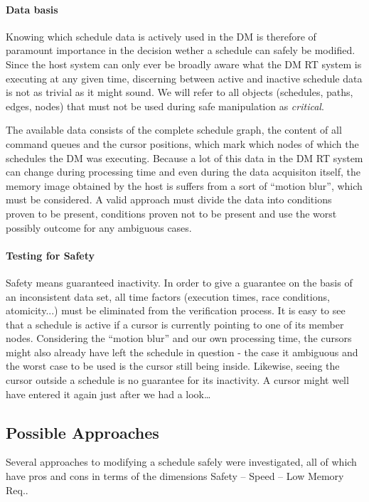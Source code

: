 \paragraph{Data basis}
Knowing which schedule data is actively used in the DM is therefore of paramount importance in the decision wether a schedule can safely be modified.
Since the host system can only ever be broadly aware what the DM RT system is executing at any given time, discerning between active and inactive schedule data is not as trivial as it might sound.
We will refer to all objects (schedules, paths, edges, nodes) that must not be used during safe manipulation as \emph{critical}.
\par
The available data consists of the complete schedule graph, the content of all command queues and the cursor positions, which mark which nodes of which the schedules the DM was executing.
Because a lot of this data in the DM RT system can change during processing time and even during the data acquisiton itself, the memory image obtained by the host is suffers from a sort of \enquote{motion blur}, which must be considered. A valid approach must divide the data into conditions proven to be present, conditions proven not to be present and use the worst possibly outcome for any ambiguous cases.
\paragraph{Testing for Safety}
Safety means guaranteed inactivity. In order to give a guarantee on the basis of an inconsistent data set, all time factors (execution times, race conditions, atomicity...) must be eliminated from the verification process.
It is easy to see that a schedule is active if a cursor is currently pointing to one of its member nodes.
Considering the \enquote{motion blur} and our own processing time, the cursors might also already have left the schedule in question - the case it ambiguous and the worst case to be used is the cursor still being inside.
Likewise, seeing the cursor outside a schedule is no guarantee for its inactivity. A cursor might well have entered it again just after we had a look\dots

\subsection{Possible Approaches}
Several approaches to modifying a schedule safely were investigated, all of which have pros and cons in terms of the dimensions Safety -- Speed -- Low Memory Req..



